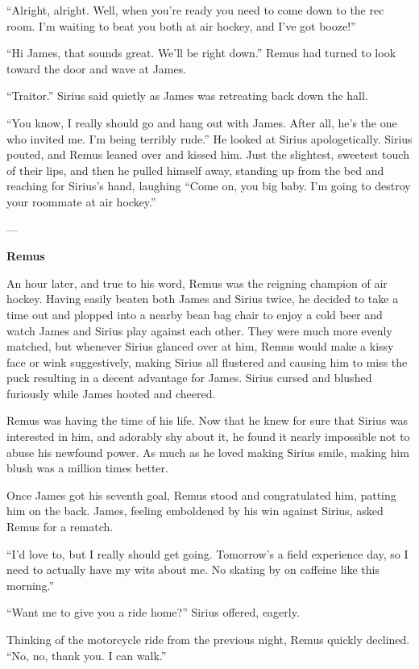 \documentclass[12pt,twoside,openright]{memoir}
\begin{document}
``Alright, alright. Well, when you're ready you need to come down to the rec room. I'm waiting to beat you both at air hockey, and I've got booze!''

``Hi James, that sounds great. We'll be right down.'' Remus had turned to look toward the door and wave at James.

``Traitor.'' Sirius said quietly as James was retreating back down the hall.

``You know, I really should go and hang out with James. After all, he's the one who invited me. I'm being terribly rude.''
He looked at Sirius apologetically. Sirius pouted, and Remus leaned over and kissed him. Just the slightest, sweetest touch of their lips, and then he pulled himself away, standing up from the bed and reaching for Sirius's hand, laughing
``Come on, you big baby. I'm going to destroy your roommate at air hockey.''

---

\textbf{Remus} 

An hour later, and true to his word, Remus was the reigning champion of air hockey. Having easily beaten both James and Sirius twice, he decided to take a time out and plopped into a nearby bean bag chair to enjoy a cold beer and watch James and Sirius play against each other. They were much more evenly matched, but whenever Sirius glanced over at him, Remus would make a kissy face or wink suggestively, making Sirius all flustered and causing him to miss the puck resulting in a decent advantage for James. Sirius cursed and blushed furiously while James hooted and cheered.

Remus was having the time of his life. Now that he knew for sure that Sirius was interested in him, and adorably shy about it, he found it nearly impossible not to abuse his newfound power. As much as he loved making Sirius smile, making him blush was a million times better.

Once James got his seventh goal, Remus stood and congratulated him, patting him on the back. James, feeling emboldened by his win against Sirius, asked Remus for a rematch.

``I'd love to, but I really should get going. Tomorrow's a field experience day, so I need to actually have my wits about me. No skating by on caffeine like this morning.''

``Want me to give you a ride home?'' Sirius offered, eagerly.

Thinking of the motorcycle ride from the previous night, Remus quickly declined. ``No, no, thank you. I can walk.''
\end{document}
